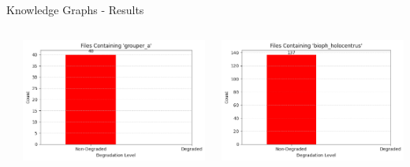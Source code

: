 \begin{frame}{Knowledge Graphs - Results}
\begin{columns}
\begin{column}{0.33\textwidth}
        \end{column}
        \begin{column}{0.33\textwidth}
            \centering
            \includegraphics[height=1.0\textheight,width=1.0\textwidth,keepaspectratio]{images/knowledge_graph_results_3.png}
        \end{column}
        \begin{column}{0.33\textwidth}
            \centering
            \includegraphics[height=1.0\textheight,width=1.0\textwidth,keepaspectratio]{images/knowledge_graph_results_4.png}
        \end{column}
    \end{columns}
\end{frame}

